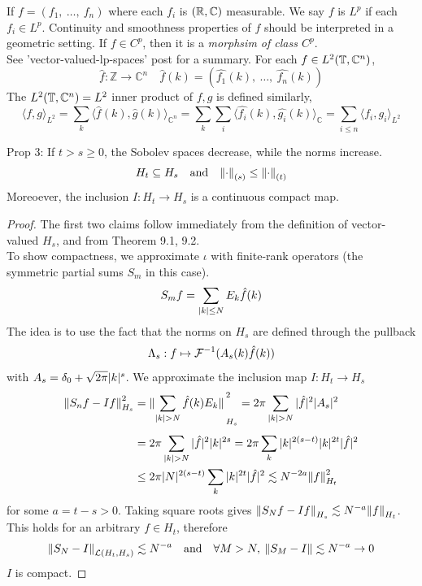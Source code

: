 \documentclass[../main-v2-manifolds.tex]{subfiles}
\begin{document}
If $f = (f_1,\: \ldots, \: f_n)$ where each $f_i$ is $(\mathbb{R},\mathbb{C})$ measurable. We say $f$ is $L^p$ if each $f_i\in L^p$. Continuity and smoothness properties of $f$ should be interpreted in a geometric setting. If $f\in C^p$, then it is a \emph{morphsim of class $C^p$}.\\
See 'vector-valued-lp-spaces' post for a summary.
For each $f\in L^2(\mathbb{T}, \mathbb{C}^n)$, 
\[
\hat{f}:\mathbb{Z}\to\mathbb{C}^n\quad \hat{f}(k) = (\hat{f_1}(k),\:\ldots,\:\hat{f_n}(k))
\]
The $L^2(\mathbb{T},\mathbb{C}^n)=L^2$ inner product of $f,g$ is defined similarly,
\[
\langle f,g\rangle_{L^2} = \sum_k \langle \hat{f}(k),\hat{g}(k)\rangle_{\mathbb{C}^n} =\sum_k\sum_i\langle\hat{f_i}(k),\hat{g_i} (k)\rangle_{\mathbb{C}} =\sum_{i\leq n}\langle f_i,g_i\rangle_{L^2}
\]
\begin{wts}
Prop 3: If $t>s\geq 0$, the Sobolev spaces decrease, while the norms increase.
\[
H_t\subseteq H_s\quad\text{and}\quad \norm{\cdot}_{(s)}\leq\norm{\cdot}_{(t)}
\]
Moreoever, the inclusion $I: H_t\to H_s$ is a continuous compact map.
\end{wts}
\begin{proof}
The first two claims follow immediately from the definition of vector-valued $H_s$, and from Theorem 9.1, 9.2.\\

To show compactness, we approximate $\iota$ with finite-rank operators (the symmetric partial sums $S_m$ in this case).
\[
S_m f = \sum_{\vert {k} \vert \leq N} E_k\hat{f}(k)
\]
The idea is to use the fact that the norms on $H_s$ are defined through the pullback
\[
\Lambda_s: f\mapsto \mathcal{F}^{-1}(A_s(k)\hat{f}(k))
\]
with $A_s = \delta_0 + \sqrt{2\pi}\vert {k} \vert^{s}$. We approximate the inclusion map $I: H_t\to H_s$
\begin{align*}
\norm{S_n f - If}_{H_s}^{2} &= \norm*{\sum_{\vert {k} \vert > N}\hat{f}(k)E_k }_{H_s}^{2}=2\pi\sum_{{\vert {k} \vert> N}}\vert {\hat{f}} \vert^2\vert {A_s} \vert^2\\[1ex]
&=2\pi\sum_{\vert {k} \vert> N}\vert {\hat{f}} \vert^2\vert {k} \vert^{2s}=2\pi\sum_{k}\vert {k} \vert^{2(s-t)} \vert {k} \vert^{2t}\vert {\hat{f}} \vert^2\\
&\leq 2\pi\vert {N} \vert^{2(s-t)}\sum_{k}\vert {k} \vert^{2t}\vert {\hat{f}} \vert^2\lesssim N^{-2a}\norm{f}^2_{H_t}
\end{align*}
for some $a = t-s > 0$. Taking square roots gives $\norm{S_N f - If}_{H_s}\lesssim N^{-a}\norm{f}_{H_t}$. This holds for an arbitrary $f\in H_t$, therefore
\[
\norm{S_N -I}_{\mathcal{L}(H_t, H_s)}\lesssim N^{-a}\quad\text{and}\quad\forall M>N,\: \norm{S_M - I}\lesssim N^{-a}\to 0
\]
$I$ is compact.
\end{proof}
\end{document}

